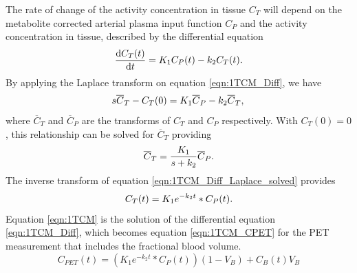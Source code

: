 The rate of change of the activity concentration in tissue $C_T$ will depend on the metabolite corrected arterial plasma input function $C_P$ and the activity concentration in tissue, described by the differential equation
%
\begin{equation}
  \frac{\mathrm d C_T(t)}{\mathrm d t} = K_1 C_P(t) - k_2 C_T(t) \\ . \\
  \label{eqn:1TCM_Diff}
\end{equation}
By applying the Laplace transform on equation \ref{eqn:1TCM_Diff}, we have
\begin{equation}
  s \overline{C}_T - C_T(0) = K_1 \overline{C}_P - k_2 \overline{C}_T  \\  ,  \\ 
  \label{eqn:1TCM_Diff_Laplace}
\end{equation}
where $\overline{C}_T$ and $\overline{C}_P$ are the transforms of ${C_T}$ and ${C_P}$ respectively. With $C_T(0)=0$, this relationship can be solved for $\overline{C}_T$ providing
\begin{equation}
\overline{C}_T =  \frac{K_1}{s+k_2} \overline{C}_P  \\  .  \\ 
  \label{eqn:1TCM_Diff_Laplace_solved}
\end{equation}
The inverse transform of equation \ref{eqn:1TCM_Diff_Laplace_solved} provides
\begin{equation}
   C_T(t) = K_1 e^{-k_2 t} \ast C_P(t)  \\  .  \\  
  \label{eqn:1TCM}
\end{equation}
Equation \ref{eqn:1TCM} is the solution of the differential equation \ref{eqn:1TCM_Diff}, which becomes equation \ref{eqn:1TCM_CPET} for the PET measurement that includes the fractional blood volume. 
%
\begin{equation}
   C_{PET}(t) =   \left(K_1 e^{-k_2 t} \ast C_P(t)\right) (1-V_B) + C_B(t) V_B
  \label{eqn:1TCM_CPET}
\end{equation}
%

